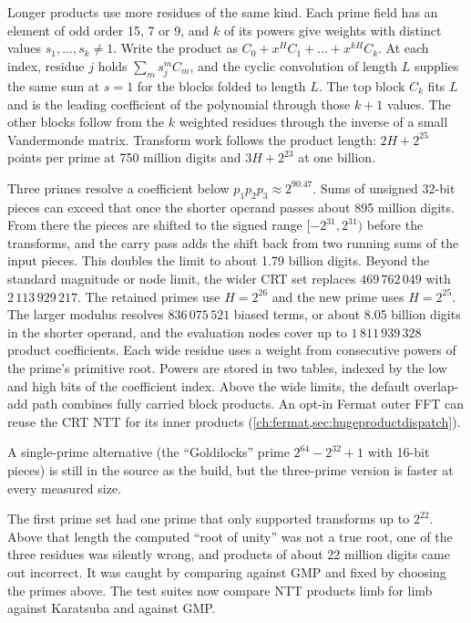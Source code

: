 Longer products use more residues of the same kind. Each prime field has an
element of odd order 15, 7 or 9, and $k$ of its powers give weights with distinct
values $s_1,\dots,s_k\ne 1$. Write the product as
$C_0+x^H C_1+\dots+x^{kH}C_k$. At each index, residue $j$ holds
$\sum_m s_j^m C_m$, and the cyclic convolution of length $L$ supplies the same
sum at $s=1$ for the blocks folded to length $L$. The top block $C_k$ fits $L$
and is the leading coefficient of the polynomial through those $k+1$ values.
The other blocks follow from the $k$ weighted residues through the inverse of a
small Vandermonde matrix. Transform work follows the product length:
$2H+2^{25}$ points per prime at 750 million digits and $3H+2^{23}$ at one
billion.

Three primes resolve a coefficient below $p_1p_2p_3\approx 2^{90.47}$. Sums of
unsigned 32-bit pieces can exceed that once the shorter operand passes about
895 million digits. From there the pieces are shifted to the signed range
$[-2^{31},2^{31})$ before the transforms, and the carry pass adds the shift
back from two running sums of the input pieces. This doubles the limit to about
1.79 billion digits. Beyond the standard magnitude or node limit, the wider
CRT set replaces $469\,762\,049$ with $2\,113\,929\,217$. The retained
primes use $H=2^{26}$ and the new prime uses $H=2^{25}$. The larger
modulus resolves $836\,075\,521$ biased terms, or about 8.05 billion
digits in the shorter operand, and the evaluation nodes cover up to
$1\,811\,939\,328$ product coefficients. Each wide residue uses a weight
from consecutive powers of the prime's primitive root. Powers are stored
in two tables, indexed by the low and high bits of the coefficient index.
Above the wide limits, the default overlap-add path combines fully carried
block products. An opt-in Fermat outer FFT can reuse the CRT NTT for its
inner products (\cref{ch:fermat,sec:hugeproductdispatch}).

A single-prime alternative (the ``Goldilocks'' prime $2^{64} - 2^{32} + 1$ with
16-bit pieces) is still in the source as the  build, but the
three-prime version is faster at every measured size.

\begin{pitfall}
The first prime set had one prime that only supported transforms up to $2^{22}$. Above
that length the computed ``root of unity'' was not a true root, one of the three residues
was silently wrong, and products of about 22 million digits came out incorrect. It was
caught by comparing against GMP and fixed by choosing the primes above. The test suites
now compare NTT products limb for limb against Karatsuba and against GMP.
\end{pitfall}

